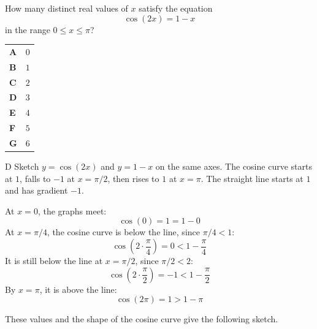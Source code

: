 \documentclass[11pt,a4paper]{article}
\begin{document}
\begin{enumerate}[label=\textbf{\arabic*.},leftmargin=*,itemsep=0pt,start=3]
\questionitem[Trigonometry]
How many distinct real values of $x$ satisfy the equation \[ \cos(2x)=1-x \] in the range $0\le x\le \pi$?

\par\vspace*{12pt}
\begin{tabularx}{\linewidth}{@{}>{\bfseries}l Y@{}}
A &
$0$
\\[0.8em]
B &
$1$
\\[0.8em]
C &
$2$
\\[0.8em]
D &
$3$
\\[0.8em]
E &
$4$
\\[0.8em]
F &
$5$
\\[0.8em]
G &
$6$
\\
\end{tabularx}

\begin{djsSolution}{D}
Sketch $y=\cos(2x)$ and $y=1-x$ on the same axes. The cosine curve starts at $1$, falls to $-1$ at $x=\pi/2$, then rises to $1$ at $x=\pi$. The straight line starts at $1$ and has gradient $-1$.

At $x=0$, the graphs meet:
\[
\cos(0)=1=1-0
\]
At $x=\pi/4$, the cosine curve is below the line, since $\pi/4<1$:
\[
\cos\left(2\cdot\frac{\pi}{4}\right)=0<1-\frac{\pi}{4}
\]
It is still below the line at $x=\pi/2$, since $\pi/2<2$:
\[
\cos\left(2\cdot\frac{\pi}{2}\right)=-1<1-\frac{\pi}{2}
\]
By $x=\pi$, it is above the line:
\[
\cos(2\pi)=1>1-\pi
\]

These values and the shape of the cosine curve give the following sketch.


\end{djsSolution}
\end{enumerate}
\end{document}
